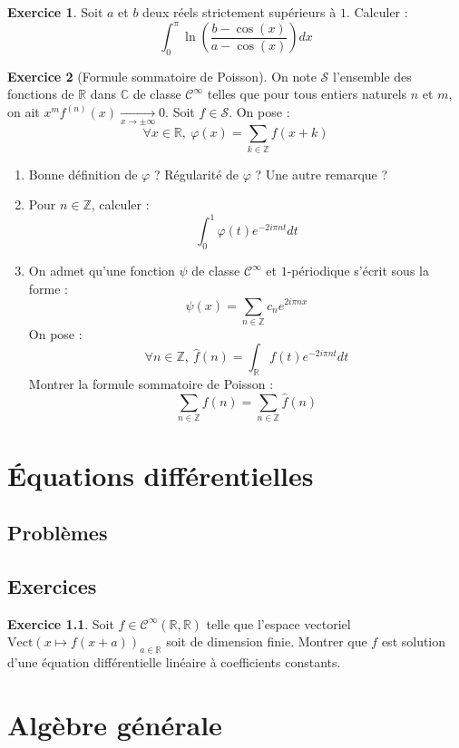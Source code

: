\documentclass[french]{book}
\newcommand{\Z}{\mathbb{Z}}
\newcommand{\R}{\mathbb{R}}
\newcommand{\C}{\mathbb{C}}
\theoremstyle{definition}
\newtheorem{ex}{Exercice}[chapter]
\begin{document}
\begin{ex}
	Soit $a$ et $b$ deux réels strictement supérieurs à $1$. Calculer : $$\int_{0}^{\pi}\ln\left(\frac{b-\cos(x)}{a-\cos(x)}\right)dx$$
\end{ex}

\begin{ex}[Formule sommatoire de Poisson]
	On note $\mathcal{S}$ l'ensemble des fonctions de $\R$ dans $\C$ de classe $\mathcal{C}^\infty$ telles que pour tous entiers naturels $n$ et $m$, on ait $x^mf^{(n)}(x)\xrightarrow[x\to\pm\infty]{}0$. Soit $f\in\mathcal{S}$. On pose : $$\forall x\in \R,\ \varphi(x)=\sum_{k\in\Z}f(x+k)$$
	\begin{enumerate}
		\item Bonne définition de $\varphi$ ? Régularité de $\varphi$ ? Une autre remarque ?
		\item Pour $n\in\Z$, calculer : $$\int_{0}^{1}\varphi(t)e^{-2i\pi nt}dt$$
		\item On admet qu'une fonction $\psi$ de classe $\mathcal{C}^\infty$ et $1$-périodique s'écrit sous la forme : $$\psi(x)=\sum_{n\in\Z}c_ne^{2i\pi nx}$$ On pose : $$\forall n\in\Z,\ \hat{f}(n)=\int_{\R}f(t)e^{-2i\pi nt}dt$$ Montrer la formule sommatoire de Poisson : $$\sum_{n\in\Z}f(n)=\sum_{n\in\Z}\hat{f}(n)$$
	\end{enumerate}
\end{ex}

\chapter{Équations différentielles}

\section{Problèmes}

\section{Exercices}

\begin{ex}
	Soit $f\in\mathcal{C}^\infty(\R,\R)$ telle que l'espace vectoriel $\text{Vect}(x\mapsto f(x+a))_{a\in\R}$ soit de dimension finie. Montrer que $f$ est solution d'une équation différentielle linéaire à coefficients constants.
\end{ex}

\chapter{Algèbre générale}
\end{document}
